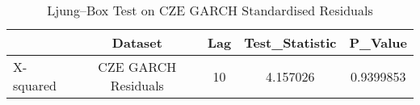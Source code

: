 \begin{table}[!h]
\centering
\caption{Ljung–Box Test on CZE GARCH Standardised Residuals}
\centering
\begin{tabular}[t]{lcccc}
\toprule
  & Dataset & Lag & Test_Statistic & P_Value\\
\midrule
X-squared & CZE GARCH Residuals & 10 & 4.157026 & 0.9399853\\
\bottomrule
\end{tabular}
\end{table}
